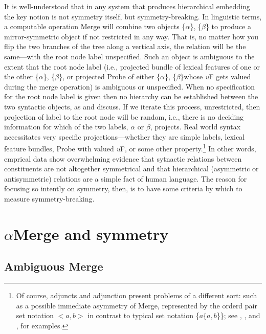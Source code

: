 \documentclass[11pt,twoside]{article}
\theoremstyle{plain}
\numberwithin{equation}{section}
\theoremstyle{definition}
\newtheorem{phrase string}{Phrase String}
\begin{document}
It is well-understood that in any system that produces hierarchical embedding the key notion is not symmetry itself, but symmetry-breaking. In linguistic terms, a computable operation Merge will combine two objects \{$\alpha$\}, \{$\beta$\} to produce a mirror-symmetric object if not restricted in any way. That is, no matter how you flip the two branches of the tree along a vertical axis, the relation will be the same---with the root node label unspecified. Such an object is ambiguous to the extent that the root node label (i.e., projected bundle of lexical features of one or the other \{$\alpha$\}, \{$\beta$\}, or projected Probe of either \{$\alpha$\}, \{$\beta$\}whose \textsl{u}F gets valued during the merge operation) is ambiguous or unspecified. When no specification for the root node label is given then no hierarchy can be established between the two syntactic objects, as \cite{boeckx08bare} and \cite{chomsky95mp} discuss. If we iterate this process, unrestricted, then projection of label to the root node will be random, i.e., there is no deciding information for which of the two labels, $\alpha$ or $\beta$, projects. Real world syntax necessitates very specific projections---whether they are simple labels, lexical feature bundles, Probe with valued \textsl{u}F, or some other property.\footnote{Of course, adjuncts and adjunction present problems of a different sort: such as a possible immediate asymmetry of Merge, represented by the orderd pair set notation \mbox{$<a, b>$} in contrast to typical set notation \{$a \{a, b$\}\}; see \cite{boeckx08bare}, \cite{chametzky:2000} \cite{hn:2008}, and \cite{rubin:2002}, \cite{rubin:2003} for examples.}  In other words, emprical data show overwhelming evidence that sytnactic relations between constituents are not altogether symmetrical and that hierarchical (asymmetric or antisymmetric) relations are a simple fact of human language. The reason for focusing so intently on symmetry, then, is to have some criteria by which to measure symmetry-breaking.


\section{$\alpha$Merge and symmetry}
\subsection{Ambiguous Merge}\label{amerge:sub}
\end{document}
